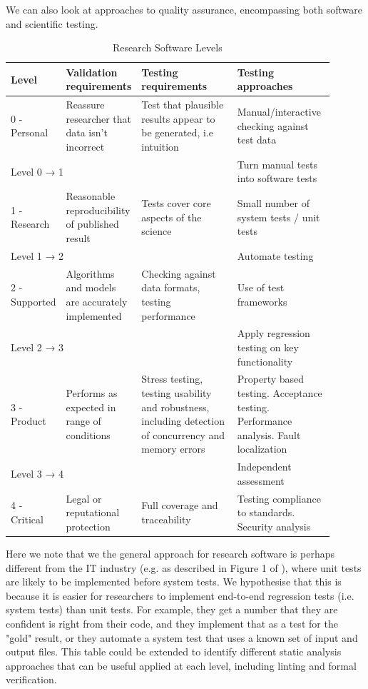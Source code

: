 \documentclass[conference]{IEEEtran}
\begin{document}
We can also look at approaches to quality assurance, encompassing both software and scientific testing. 

{\renewcommand{\arraystretch}{2}
\begin{table}[htbp]
\caption{Research Software Levels}
\begin{center}
\begin{tabular}{|p{0.1\linewidth}||p{0.2\linewidth}|p{0.3\linewidth}|p{0.3\linewidth}|}
\hline
\textbf{Level} & 
\textbf{Validation requirements} & 
\textbf{Testing requirements} & 
\textbf{Testing approaches} \\
\hline
0 - Personal &
Reassure researcher that data isn’t incorrect &
Test that plausible results appear to be generated, i.e intuition &
Manual/interactive checking against test data  \\
\hline
\multicolumn{3}{|l|}{Level 0 → 1} &
Turn manual tests into software tests \\
\hline

1 - Research &
Reasonable reproducibility of published result &
Tests cover core aspects of the science &
Small number of system tests / unit tests  \\
\hline
\multicolumn{3}{|l|}{Level 1 → 2} &
Automate testing  \\
\hline
2 - Supported &
Algorithms and models are accurately implemented &
Checking against data formats, testing performance &
Use of test frameworks  \\
\hline
\multicolumn{3}{|l|}{Level 2 → 3} &
Apply regression testing on key functionality  \\
\hline
3 - Product &
Performs as expected in range of conditions &
Stress testing, testing usability and robustness, including detection of concurrency and memory errors  &
Property based testing. Acceptance testing. Performance analysis. Fault localization \\
\hline
\multicolumn{3}{|l|}{Level 3 → 4} &
Independent assessment  \\
\hline
4 - Critical &
Legal or reputational protection &
Full coverage and traceability &
Testing compliance to standards. Security analysis \\
\hline
\end{tabular}
\label{testing}
\end{center}
\end{table}
}

Here we note that we the general approach for research software is perhaps different from the IT industry (e.g. as described in Figure 1 of \cite{Zamansky}), where unit tests are likely to be implemented before system tests. We hypothesise that this is because it is easier for researchers to implement end-to-end regression tests (i.e. system tests) than unit tests. For example, they get a number that they are confident is right from their code, and they implement that as a test for the "gold" result, or they automate a system test that uses a known set of input and output files. This table could be extended to identify different static analysis approaches that can be useful applied at each level, including linting and formal verification.
\end{document}
